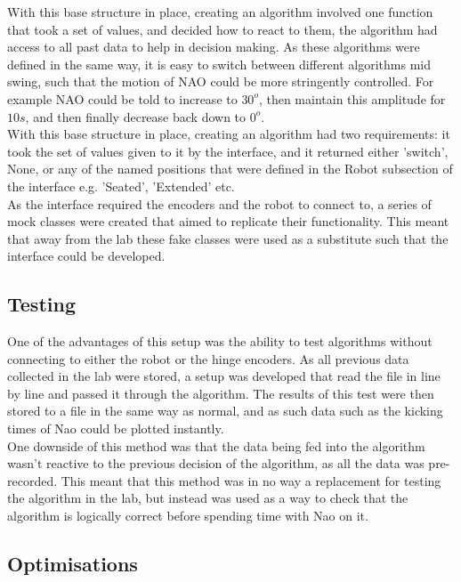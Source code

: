 \documentclass[11pt]{article}
\begin{document}
With this base structure in place, creating an algorithm involved one function that took a set of values, and decided how to react to them, the algorithm had access to all past data to help in decision making. As these algorithms were defined in the same way, it is easy to switch between different algorithms mid swing, such that the motion of NAO could be more stringently controlled. For example NAO could be told to increase to $30^o$, then maintain this amplitude for $10s$, and then finally decrease back down to $0^o$.\\

With this base structure in place, creating an algorithm had two requirements: it took the set of values given to it by the interface, and it returned either 'switch', None, or any of the named positions that were defined in the Robot subsection of the interface e.g. 'Seated', 'Extended' etc.\\

As the interface required the encoders and the robot to connect to, a series of mock classes were created that aimed to replicate their functionality. This meant that away from the lab these fake classes were used as a substitute such that the interface could be developed.

\subsection{Testing}
One of the advantages of this setup was the ability to test algorithms without connecting to either the robot or the hinge encoders. As all previous data collected in the lab were stored, a setup was developed that read the file in line by line and passed it through the algorithm. The results of this test were then stored to a file in the same way as normal, and as such data such as the kicking times of Nao could be plotted instantly.\\

One downside of this method was that the data being fed into the algorithm wasn't reactive to the previous decision of the algorithm, as all the data was pre-recorded. This meant that this method was in no way a replacement for testing the algorithm in the lab, but instead was used as a way to check that the algorithm is logically correct before spending time with Nao on it.

\subsection{Optimisations}
\end{document}
